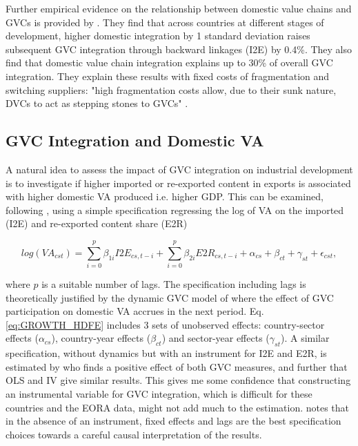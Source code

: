 \documentclass[a4paper]{article}
\begin{document}
Further empirical evidence on the relationship between domestic value chains and GVCs is provided by \citet{beverelli2019domestic}. They find that across countries at different stages of development, higher domestic integration by 1 standard deviation raises subsequent GVC integration through backward linkages (I2E) by 0.4\%. They also find that domestic value chain integration explains up to 30\% of overall GVC integration. They explain these results with fixed costs of fragmentation and switching suppliers: "high fragmentation costs allow, due to their sunk nature, DVCs to act as stepping stones to GVCs" \citep{beverelli2019domestic}. %

\subsection{GVC Integration and Domestic VA}

A natural idea to assess the impact of GVC integration on industrial development is to investigate if higher imported or re-exported content in exports is associated with higher domestic VA produced i.e. higher GDP. This can be examined, following \citet{kummritz2015global}, using a simple specification regressing the log of VA on the imported (I2E) and re-exported content share (E2R)

\begin{equation} \label{eq:GROWTH_HDFE}
log(VA_{cst}) = \sum_{i=0}^p \beta_{1i} I2E_{cs,t-i} + \sum_{i = 0}^p \beta_{2i} E2R_{cs,t-i}  + \alpha_{cs} + \beta_{ct} +\gamma_{st} + \epsilon_{cst},
\end{equation}

\noindent where $p$ is a suitable number of lags. The specification including lags is theoretically justified by the dynamic GVC model of \citet{LiLiu2015moving} where the effect of GVC participation on domestic VA accrues in the next period. Eq. \ref{eq:GROWTH_HDFE} includes 3 sets of unobserved effects: country-sector effects ($\alpha_{cs}$), country-year effects ($\beta_{ct}$) and sector-year effects ($\gamma_{st}$). A similar specification, without dynamics but with an instrument for I2E and E2R, is estimated by \citet{Kummritz20161} who finds a positive effect of both GVC measures, and further that OLS and IV give similar results. This gives me some confidence that constructing an instrumental variable for GVC integration, which is difficult for these countries and the EORA data, might not add much to the estimation. \citet{kummritz2015global} notes that in the absence of an instrument, fixed effects and lags are the best specification choices towards a careful causal interpretation of the results. \newline
\end{document}
